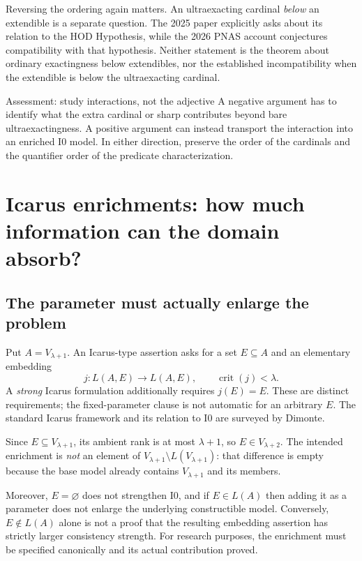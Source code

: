 \documentclass[11pt,letterpaper]{article}
\theoremstyle{definition}
\newcommand{\crit}{\operatorname{crit}}
\newcommand{\Izero}{\mathrm{I0}}
\begin{document}
Reversing the ordering again matters. An ultraexacting cardinal \emph{below} an extendible is a separate question. The 2025 paper explicitly asks about its relation to the HOD Hypothesis, while the 2026 PNAS account conjectures compatibility with that hypothesis. Neither statement is the theorem about ordinary exactingness below extendibles, nor the established incompatibility when the extendible is below the ultraexacting cardinal. \cite[Question~7.1]{abgl}\cite[Conjecture~1(3)]{pnas}

\begin{assessment}{Assessment: study interactions, not the adjective}
A negative argument has to identify what the extra cardinal or sharp contributes beyond bare ultraexactingness. A positive argument can instead transport the interaction into an enriched $\Izero$ model. In either direction, preserve the order of the cardinals and the quantifier order of the predicate characterization.
\end{assessment}

\section{Icarus enrichments: how much information can the domain absorb?}\label{sec:icarus}

\subsection{The parameter must actually enlarge the problem}

Put $A=V_{\lambda+1}$. An Icarus-type assertion asks for a set $E\subseteq A$ and an elementary embedding
\begin{equation}
 j:L(A,E)\longrightarrow L(A,E),\qquad \crit(j)<\lambda.
 \label{eq:icarus}
\end{equation}
A \emph{strong} Icarus formulation additionally requires $j(E)=E$. These are distinct requirements; the fixed-parameter clause is not automatic for an arbitrary $E$. The standard Icarus framework and its relation to $\Izero$ are surveyed by Dimonte. \cite[Section~10]{dimonte}

Since $E\subseteq V_{\lambda+1}$, its ambient rank is at most $\lambda+1$, so $E\in V_{\lambda+2}$. The intended enrichment is \emph{not} an element of $V_{\lambda+1}\setminus L(V_{\lambda+1})$: that difference is empty because the base model already contains $V_{\lambda+1}$ and its members.

Moreover, $E=\varnothing$ does not strengthen $\Izero$, and if $E\in L(A)$ then adding it as a parameter does not enlarge the underlying constructible model. Conversely, $E\notin L(A)$ alone is not a proof that the resulting embedding assertion has strictly larger consistency strength. For research purposes, the enrichment must be specified canonically and its actual contribution proved.
\end{document}
